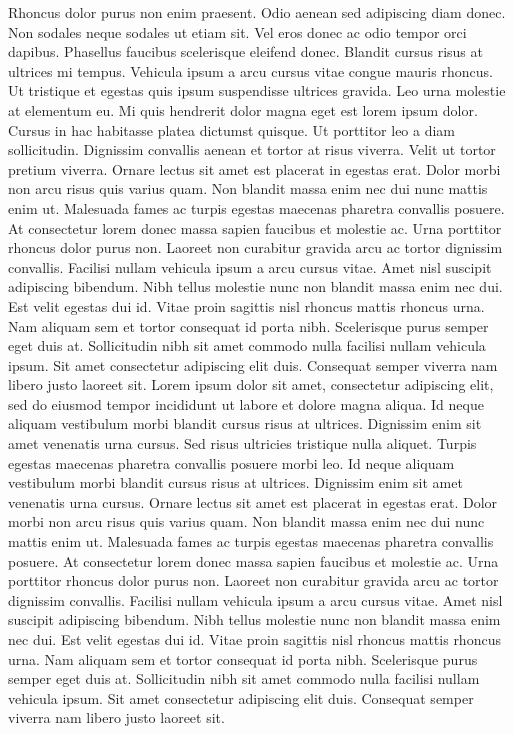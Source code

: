 \documentclass[a4paper]{article}%
\begin{document}
\newline%
Rhoncus dolor purus non enim praesent. Odio aenean sed adipiscing diam donec. Non sodales neque sodales ut etiam sit. Vel eros donec ac odio tempor orci dapibus. Phasellus faucibus scelerisque eleifend donec. Blandit cursus risus at ultrices mi tempus. Vehicula ipsum a arcu cursus vitae congue mauris rhoncus. Ut tristique et egestas quis ipsum suspendisse ultrices gravida. Leo urna molestie at elementum eu. Mi quis hendrerit dolor magna eget est lorem ipsum dolor. Cursus in hac habitasse platea dictumst quisque. Ut porttitor leo a diam sollicitudin. Dignissim convallis aenean et tortor at risus viverra. Velit ut tortor pretium viverra.\newline%
\newline%
Ornare lectus sit amet est placerat in egestas erat. Dolor morbi non arcu risus quis varius quam. Non blandit massa enim nec dui nunc mattis enim ut. Malesuada fames ac turpis egestas maecenas pharetra convallis posuere. At consectetur lorem donec massa sapien faucibus et molestie ac. Urna porttitor rhoncus dolor purus non. Laoreet non curabitur gravida arcu ac tortor dignissim convallis. Facilisi nullam vehicula ipsum a arcu cursus vitae. Amet nisl suscipit adipiscing bibendum. Nibh tellus molestie nunc non blandit massa enim nec dui. Est velit egestas dui id. Vitae proin sagittis nisl rhoncus mattis rhoncus urna. Nam aliquam sem et tortor consequat id porta nibh. Scelerisque purus semper eget duis at. Sollicitudin nibh sit amet commodo nulla facilisi nullam vehicula ipsum. Sit amet consectetur adipiscing elit duis. Consequat semper viverra nam libero justo laoreet sit.\newline%
\newline%
\newline%
Lorem ipsum dolor sit amet, consectetur adipiscing elit, sed do eiusmod tempor incididunt ut labore et dolore magna aliqua. Id neque aliquam vestibulum morbi blandit cursus risus at ultrices. Dignissim enim sit amet venenatis urna cursus. Sed risus ultricies tristique nulla aliquet. Turpis egestas maecenas pharetra convallis posuere morbi leo. Id neque aliquam vestibulum morbi blandit cursus risus at ultrices. Dignissim enim sit amet venenatis urna cursus.\newline%
\newline%
Ornare lectus sit amet est placerat in egestas erat. Dolor morbi non arcu risus quis varius quam. Non blandit massa enim nec dui nunc mattis enim ut. Malesuada fames ac turpis egestas maecenas pharetra convallis posuere. At consectetur lorem donec massa sapien faucibus et molestie ac. Urna porttitor rhoncus dolor purus non. Laoreet non curabitur gravida arcu ac tortor dignissim convallis. Facilisi nullam vehicula ipsum a arcu cursus vitae. Amet nisl suscipit adipiscing bibendum. Nibh tellus molestie nunc non blandit massa enim nec dui. Est velit egestas dui id. Vitae proin sagittis nisl rhoncus mattis rhoncus urna. Nam aliquam sem et tortor consequat id porta nibh. Scelerisque purus semper eget duis at. Sollicitudin nibh sit amet commodo nulla facilisi nullam vehicula ipsum. Sit amet consectetur adipiscing elit duis. Consequat semper viverra nam libero justo laoreet sit.\newline%

%
\end{document}
